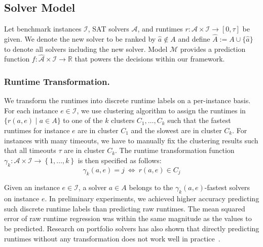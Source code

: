 \documentclass[runningheads]{llncs}
\begin{document}
\subsection{Solver Model}
\label{sec:main:model}


Let benchmark instances $\mathcal{I}$, SAT solvers $\mathcal{A}$, and runtimes $r : \mathcal{A} \times \mathcal{I} \rightarrow \left[0, \tau\right]$ be given. 
We denote the new solver to be ranked by $\hat a \not\in A$ and define $\hat A := A \cup \lbrace \hat a \rbrace$ to denote all solvers including the new solver. 
Model $\mathcal{M}$ provides a prediction function $f : \mathcal{\hat A} \times \mathcal{I} \rightarrow \mathbb{R}$ that powers the decisions within our framework.


\subsubsection{Runtime Transformation.}

We transform the runtimes into discrete runtime labels on a per-instance basis.
For each instance $e \in \mathcal{I}$, we use clustering algorithm to assign the runtimes in $\bigl\{ r(a, e) \mid a \in A \bigr\}$ to one of the $k$ clusters $C_1, \dots, C_k$ such that the fastest runtimes for instance $e$ are in cluster $C_1$ and the slowest are in cluster $C_k$.
For instances with many timeouts, we have to manually fix the clustering results such that all timeouts $\tau$ are in cluster $C_k$.
The runtime transformation function $\gamma_k : {\mathcal{A} \times \mathcal{I}} \rightarrow \left\lbrace 1, \dots, k \right\rbrace$ is then specified as follows:
%
$$\gamma_k(a, e) = j ~\Leftrightarrow~ r(a, e) \in C_j$$

Given an instance $e \in \mathcal{I}$, a solver $a \in A$ belongs to the $\gamma_k(a, e)$-fastest solvers on instance $e$. 
In preliminary experiments, we achieved higher accuracy predicting such discrete runtime labels than predicting raw runtimes. 
The mean squared error of raw runtime regression was within the same magnitude as the values to be predicted. 
Research on portfolio solvers has also shown that directly predicting runtimes without any transformation does not work well in practice~\cite{CollauttiMMO13,NgokoCT19}.
\end{document}
